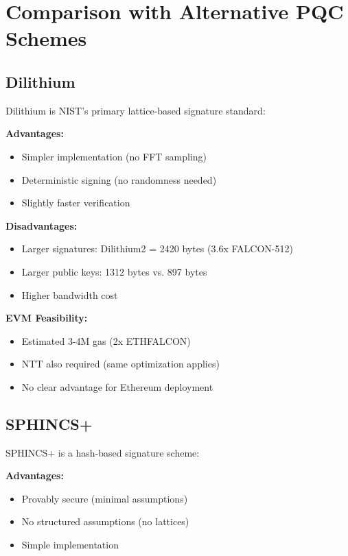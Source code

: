 \documentclass[11pt,a4paper]{article}
\begin{document}
\section{Comparison with Alternative PQC Schemes}

\subsection{Dilithium}

Dilithium \cite{ducas2018crystals} is NIST's primary lattice-based signature standard:

\textbf{Advantages:}
\begin{itemize}
    \item Simpler implementation (no FFT sampling)
    \item Deterministic signing (no randomness needed)
    \item Slightly faster verification
\end{itemize}

\textbf{Disadvantages:}
\begin{itemize}
    \item Larger signatures: Dilithium2 = 2420 bytes (3.6x FALCON-512)
    \item Larger public keys: 1312 bytes vs. 897 bytes
    \item Higher bandwidth cost
\end{itemize}

\textbf{EVM Feasibility:}
\begin{itemize}
    \item Estimated 3-4M gas (2x ETHFALCON)
    \item NTT also required (same optimization applies)
    \item No clear advantage for Ethereum deployment
\end{itemize}

\subsection{SPHINCS+}

SPHINCS+ \cite{bernstein2019sphincs} is a hash-based signature scheme:

\textbf{Advantages:}
\begin{itemize}
    \item Provably secure (minimal assumptions)
    \item No structured assumptions (no lattices)
    \item Simple implementation
\end{itemize}
\end{document}
